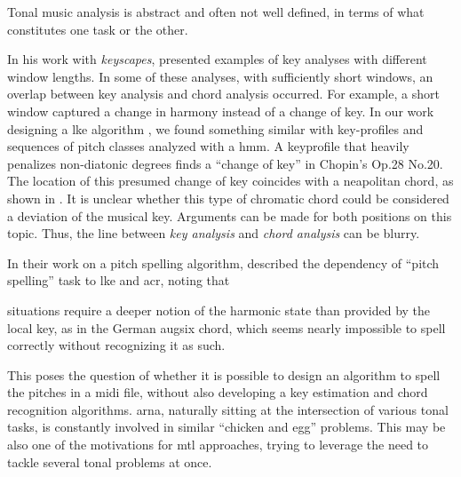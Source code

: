 

Tonal music analysis is abstract and often not well defined,
in terms of what constitutes one task or the other.


In his work with \emph{keyscapes},
\textcite{sapp2011computational} presented examples of key
analyses with different window lengths. In some of these
analyses, with sufficiently short windows, an overlap
between key analysis and chord analysis occurred. For
example, a short window captured a change in harmony instead
of a change of key. In our work designing a \gls{lke}
algorithm \parencite{napoleslopez2019keyfinding}, we found
something similar with key-profiles and sequences of pitch
classes analyzed with a \gls{hmm}. A \gls{keyprofile} that
heavily penalizes non-diatonic degrees finds a ``change of
key'' in Chopin's Op.28 No.20. The location of this presumed
change of key coincides with a \gls{neapolitan} chord, as
shown in . It is unclear whether this type
of chromatic chord could be considered a deviation of the
musical key. Arguments can be made for both positions on
this topic. Thus, the line between \emph{key analysis} and
\emph{chord analysis} can be blurry.



In their work on a pitch spelling algorithm,
\textcite{teodoru2007pitch} described the dependency of
``pitch spelling'' task to \gls{lke} and \gls{acr}, noting
that 

\begin{italicquotes}
 situations require a deeper notion of the
harmonic state than provided by the local key, as in the
German \gls{augsix} chord, which seems nearly impossible to
spell correctly without recognizing it as such.
\end{italicquotes}

This poses the question of whether it is possible to design
an algorithm to spell the pitches in a \gls{midi} file,
without also developing a key estimation and chord
recognition algorithms. \gls{arna}, naturally sitting at the
intersection of various tonal tasks, is constantly involved
in similar ``chicken and egg'' problems. This may be also
one of the motivations for \gls{mtl} approaches, trying to
leverage the need to tackle several tonal problems at once.
